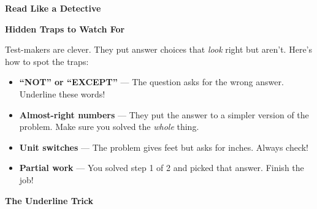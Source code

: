 \clearpage
\thispagestyle{empty}
{\sffamily

\begin{center}
{\fontsize{22}{26}\selectfont\bfseries\color{funPurple} \faEye\hspace{3mm}Read Like a Detective\hspace{3mm}\faEye}

\vspace{2mm}
{\color{funGray}\hrulefill}
\end{center}

\vspace{3mm}

\begin{tcolorbox}[
    enhanced,
    colback=funPurpleLight,
    colframe=funPurple!50,
    arc=10pt,
    boxrule=1.5pt,
    left=6mm, right=6mm, top=5mm, bottom=5mm,
]
{\large\bfseries\color{funPurpleDark} \faUserSecret\hspace{2mm}Hidden Traps to Watch For}

\vspace{2mm}

Test-makers are clever. They put answer choices that \textit{look} right but aren't. Here's how to spot the traps:

\vspace{3mm}

\begin{itemize}[leftmargin=6mm, itemsep=3pt]
    \item[\textcolor{funPurple}{\faExclamationCircle}] \textbf{``NOT'' or ``EXCEPT''} — The question asks for the wrong answer. Underline these words!
    \item[\textcolor{funPurple}{\faExclamationCircle}] \textbf{Almost-right numbers} — They put the answer to a simpler version of the problem. Make sure you solved the \textit{whole} thing.
    \item[\textcolor{funPurple}{\faExclamationCircle}] \textbf{Unit switches} — The problem gives feet but asks for inches. Always check!
    \item[\textcolor{funPurple}{\faExclamationCircle}] \textbf{Partial work} — You solved step 1 of 2 and picked that answer. Finish the job!
\end{itemize}
\end{tcolorbox}

\vspace{3mm}

\begin{tcolorbox}[
    enhanced,
    colback=funYellowLight,
    colframe=funYellow!60,
    arc=10pt,
    boxrule=1pt,
    left=6mm, right=6mm, top=4mm, bottom=4mm,
]
{\bfseries\color{funYellowDark} \faLightbulb\hspace{2mm}The Underline Trick}


\end{tcolorbox}}

